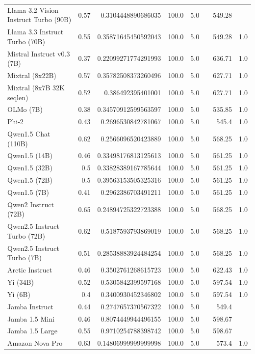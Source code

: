 \begin{table}[htp]
{\begin{tabular}{lrrrrrrr}
Llama 3.2 Vision Instruct Turbo (90B) & 0.57 & 0.3104448890686035 & 100.0 & 5.0 &  & 549.28 &  \\
Llama 3.3 Instruct Turbo (70B) & 0.55 & 0.35871645450592043 & 100.0 & 5.0 &  & 549.28 & 1.0 \\
Mistral Instruct v0.3 (7B) & 0.37 & 0.22099271774291993 & 100.0 & 5.0 &  & 636.71 & 1.0 \\
Mixtral (8x22B) & 0.57 & 0.35782508373260496 & 100.0 & 5.0 &  & 627.71 & 1.0 \\
Mixtral (8x7B 32K seqlen) & 0.52 & 0.386492395401001 & 100.0 & 5.0 &  & 627.71 & 1.0 \\
OLMo (7B) & 0.38 & 0.34570912599563597 & 100.0 & 5.0 &  & 535.85 & 1.0 \\
Phi-2 & 0.43 & 0.2696530842781067 & 100.0 & 5.0 &  & 545.4 & 1.0 \\
Qwen1.5 Chat (110B) & 0.62 & 0.2566096520423889 & 100.0 & 5.0 &  & 568.25 & 1.0 \\
Qwen1.5 (14B) & 0.46 & 0.33498176813125613 & 100.0 & 5.0 &  & 561.25 & 1.0 \\
Qwen1.5 (32B) & 0.5 & 0.33828389167785644 & 100.0 & 5.0 &  & 561.25 & 1.0 \\
Qwen1.5 (72B) & 0.5 & 0.39563153505325316 & 100.0 & 5.0 &  & 561.25 & 1.0 \\
Qwen1.5 (7B) & 0.41 & 0.2962386703491211 & 100.0 & 5.0 &  & 561.25 & 1.0 \\
Qwen2 Instruct (72B) & 0.65 & 0.24894725322723388 & 100.0 & 5.0 &  & 568.25 & 1.0 \\
Qwen2.5 Instruct Turbo (72B) & 0.62 & 0.5187593793869019 & 100.0 & 5.0 &  & 568.25 & 1.0 \\
Qwen2.5 Instruct Turbo (7B) & 0.51 & 0.28538883924484254 & 100.0 & 5.0 &  & 568.25 & 1.0 \\
Arctic Instruct & 0.46 & 0.3502761268615723 & 100.0 & 5.0 &  & 622.43 & 1.0 \\
Yi (34B) & 0.52 & 0.5305842399597168 & 100.0 & 5.0 &  & 597.54 & 1.0 \\
Yi (6B) & 0.4 & 0.3400930452346802 & 100.0 & 5.0 &  & 597.54 & 1.0 \\
Jamba Instruct & 0.44 & 0.2747657370567322 & 100.0 & 5.0 &  & 549.4 &  \\
Jamba 1.5 Mini & 0.46 & 0.8074449944496155 & 100.0 & 5.0 &  & 598.67 &  \\
Jamba 1.5 Large & 0.55 & 0.9710254788398742 & 100.0 & 5.0 &  & 598.67 &  \\
Amazon Nova Pro & 0.63 & 0.14806999999999998 & 100.0 & 5.0 &  & 573.4 & 1.0 \\

\end{tabular}}
\end{table}
